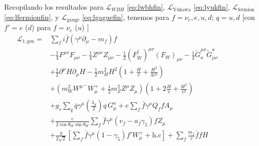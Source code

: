 \begin{frame}
Recopilando los resultados para $\mathcal{L}_{WBH}$ \eqref{eq:lwbhfin}, $\mathcal{L}_{\text{Yukawa}}$ \eqref{eq:lyukfin}, $\mathcal{L}_{\text{fermion}}$ \eqref{eq:lfermionfin}, y $\mathcal{L}_{\text{gauge}}$ \eqref{eq:lgaguefin}, tenemos  para $f=\nu_e,e,u,d$; $q=u,d$ [con $f'=e$ ($d$) para $f=\nu_e$ ($u$) ]
\begin{align}
  \mathcal{L}_{\text{1 gen}}=&\sum_f i\bar{f}\left(\gamma^\mu\partial_\mu-m_f\right)f\nonumber\\
&-\tfrac{1}{4}F^{\mu\nu} F_{\mu\nu}-\tfrac{1}{4}Z^{\mu\nu} Z_{\mu\nu}-\tfrac{1}{2}(F_W^\dagger)^{\mu\nu} (F_W)_{\mu\nu}
- \tfrac{1}{4}\widetilde{G}^{\mu\nu}_a \widetilde{G}_{\mu\nu}^a\nonumber\\
&+\tfrac{1}{2}\partial^\mu H\partial_\mu H
-\frac{1}{2}m_H^2H^2\left(1+\frac{H}{v}+\frac{H^2}{4v^2}\right)\nonumber\\
&+\left(m_W^2{W^\mu}^-W_\mu^++\frac{1}{2}m_Z^2Z^\mu Z_\mu\right)\left(1+2\frac{H}{v}+\frac{H^2}{v^2}\right)\nonumber\\
&+g_s\sum_q\bar{q}\gamma^\mu\left(\frac{\lambda_a}{2}\right)q\,G_\mu^a+e\sum_f \bar{f}\gamma^\mu Q_f f A_\mu\nonumber\\
&+\frac{e}{2\cos\theta_W\sin\theta_W}\sum_{f}\bar{f}\gamma^\mu(v_f-a_f\gamma_5)f Z_\mu\nonumber\\
&+\frac{g}{2\sqrt{2}}\left[\sum_{f}\bar{f}\gamma^\mu(1-\gamma_5)f' W_\mu^++\text{h.c}\right]
+\sum_f \frac{m_f}{v} \bar{f}f H\nonumber\\
&\phantom{- \frac{1}{4}\left(g_s\widetilde{G}^{\mu\nu}_af_{a d e}G^d_\mu G^e_\nu
    +g_sf^{a b c}G_b^\mu G_c^\nu\widetilde{G}_{\mu\nu}^a
    +g_s^2f^{a b c}f_{a d e}G_b^\mu G_c^\nu G^d_\mu G^e_\nu\right)\,.}\nonumber
\end{align}
\end{frame}
